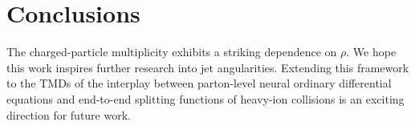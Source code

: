 \section{Conclusions}\label{sec:conclusions}

The charged-particle multiplicity exhibits a striking dependence on
$\rho$. We hope this work inspires further research into jet
angularities. Extending this framework to the TMDs of the interplay
between parton-level neural ordinary differential equations and
end-to-end splitting functions of heavy-ion collisions is an exciting
direction for future work.

